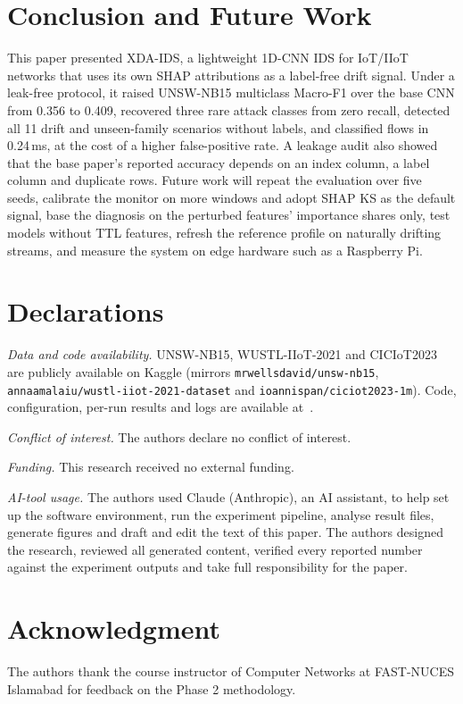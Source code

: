 \documentclass[conference]{IEEEtran}
\begin{document}
\section{Conclusion and Future Work}\label{sec:conclusion}
This paper presented XDA-IDS, a lightweight 1D-CNN IDS for IoT/IIoT networks that uses its own SHAP attributions as a label-free drift signal. Under a leak-free protocol, it raised UNSW-NB15 multiclass Macro-F1 over the base CNN from 0.356 to 0.409, recovered three rare attack classes from zero recall, detected all 11 drift and unseen-family scenarios without labels, and classified flows in 0.24\,ms, at the cost of a higher false-positive rate. A leakage audit also showed that the base paper's reported accuracy depends on an index column, a label column and duplicate rows. Future work will repeat the evaluation over five seeds, calibrate the monitor on more windows and adopt SHAP KS as the default signal, base the diagnosis on the perturbed features' importance shares only, test models without TTL features, refresh the reference profile on naturally drifting streams, and measure the system on edge hardware such as a Raspberry Pi.

\section*{Declarations}
\textit{Data and code availability.} UNSW-NB15, WUSTL-IIoT-2021 and CICIoT2023 are publicly available on Kaggle (mirrors \texttt{mrwellsdavid/unsw-nb15}, \texttt{annaamalaiu/wustl-iiot-2021-dataset} and \texttt{ioannispan/ciciot2023-1m}). Code, configuration, per-run results and logs are available at~\cite{repo}.

\textit{Conflict of interest.} The authors declare no conflict of interest.

\textit{Funding.} This research received no external funding.

\textit{AI-tool usage.} The authors used Claude (Anthropic), an AI assistant, to help set up the software environment, run the experiment pipeline, analyse result files, generate figures and draft and edit the text of this paper. The authors designed the research, reviewed all generated content, verified every reported number against the experiment outputs and take full responsibility for the paper.

\section*{Acknowledgment}
The authors thank the course instructor of Computer Networks at FAST-NUCES Islamabad for feedback on the Phase 2 methodology.



\end{document}
